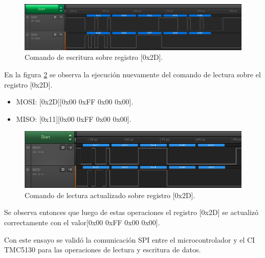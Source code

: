 \begin{figure}[h!]
\centering 
\includegraphics[width=1\textwidth]{./Figures/ensayo_spi_b.png}
\caption{Comando de escritura sobre registro [0x2D].}
\label{fig:ensayo_spi_b}
\end{figure}

En la figura \ref{fig:ensayo_spi_c} se observa la ejecución nuevamente del comando de lectura sobre el registro [0x2D].

\begin{itemize}
\item MOSI: [0x2D][0x00 0xFF 0x00 0x00].
\item MISO: [0x11][0x00 0xFF 0x00 0x00].
\end{itemize}


\begin{figure}[h!]
\centering 
\includegraphics[width=1\textwidth]{./Figures/ensayo_spi_c_c.png}
\caption{Comando de lectura actualizado sobre registro [0x2D].}
\label{fig:ensayo_spi_c}
\end{figure}

Se observa entonces que luego de estas operaciones el registro [0x2D] se actualizó correctamente con el valor[0x00 0xFF 0x00 0x00].

Con este ensayo se validó la comunicación SPI entre el microcontrolador y el CI TMC5130 para las operaciones de lectura y escritura de datos.




